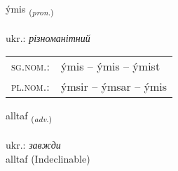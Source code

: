 \documentclass[frontgrid, backgrid]{flacards}\usepackage[]{graphicx}\usepackage[]{xcolor}
\begin{document}
\renewcommand{\blhead}{\vskip5pt {\small\bfseries\footnotesize Fornafn | займенник }}
\renewcommand{\bcfoot}{\vskip5pt \hspace{2pt}{\small\bfseries\footnotesize 1K}}


{ýmis \small{\textsubscript{(\textit{pron.})}} \\[1ex] %
\textphonetic{[iːmɪs]} \\
ukr.: \emph{різноманітний} \\  [2ex]
\renewcommand*{\arraystretch}{0.8}
\begin{tabular}{ll}
\textsc{sg.nom.}: & ýmis  --  ýmis -- ýmist \\ 
\textsc{pl.nom.}: & ýmsir -- ýmsar -- ýmis
\end{tabular}
}


\renewcommand{\flhead}{\vskip5pt \fboxsep=0pt {\small\bfseries\footnotesize Atviksorð | прислівник}}
\renewcommand{\fcfoot}{\vskip5pt \fboxsep=0pt \hspace{2pt}{\small\bfseries\footnotesize 1K}}

\renewcommand{\blhead}{\vskip5pt {\small\bfseries\footnotesize Atviksorð | прислівник }}
\renewcommand{\bcfoot}{\vskip5pt \hspace{2pt}{\small\bfseries\footnotesize 1K}}


{alltaf \small{\textsubscript{(\textit{adv.})}} \\[1ex]
\textphonetic{[al̥taf]} \\
ukr.: \emph{завжди} \\  [2ex]
alltaf (Indeclinable)}


\renewcommand{\flhead}{\vskip5pt \fboxsep=0pt {\small\bfseries\footnotesize Atviksorð | прислівник}}
\renewcommand{\fcfoot}{\vskip5pt \fboxsep=0pt \hspace{2pt}{\small\bfseries\footnotesize 1K}}

\renewcommand{\blhead}{\vskip5pt {\small\bfseries\footnotesize Atviksorð | прислівник }}
\renewcommand{\bcfoot}{\vskip5pt \hspace{2pt}{\small\bfseries\footnotesize 1K}}
\end{document}
